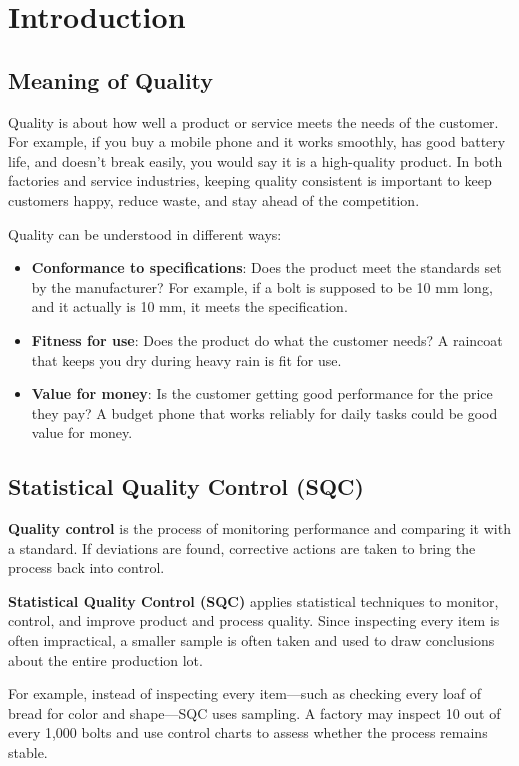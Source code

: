 \documentclass[twoside]{book}
\begin{document}
\section{Introduction}

\subsection{Meaning of Quality}

Quality is about how well a product or service meets the needs of the customer. For example, if you buy a mobile phone and it works smoothly, has good battery life, and doesn't break easily, you would say it is a high-quality product. In both factories and service industries, keeping quality consistent is important to keep customers happy, reduce waste, and stay ahead of the competition.

Quality can be understood in different ways:
\begin{itemize}
    \item \textbf{Conformance to specifications}: Does the product meet the standards set by the manufacturer? For example, if a bolt is supposed to be 10 mm long, and it actually is 10 mm, it meets the specification.
    \item \textbf{Fitness for use}: Does the product do what the customer needs? A raincoat that keeps you dry during heavy rain is fit for use.
    \item \textbf{Value for money}: Is the customer getting good performance for the price they pay? A budget phone that works reliably for daily tasks could be good value for money.
\end{itemize}

\subsection{Statistical Quality Control (SQC)}

\textbf{Quality control} is the process of monitoring performance and comparing it with a standard. If deviations are found, corrective actions are taken to bring the process back into control.

\textbf{Statistical Quality Control (SQC)} applies statistical techniques to monitor, control, and improve product and process quality. Since inspecting every item is often impractical, a smaller sample is often taken and used to draw conclusions about the entire production lot.

For example, instead of inspecting every item—such as checking every loaf of bread for color and shape—SQC uses sampling. A factory may inspect 10 out of every 1,000 bolts and use control charts to assess whether the process remains stable.
\end{document}
